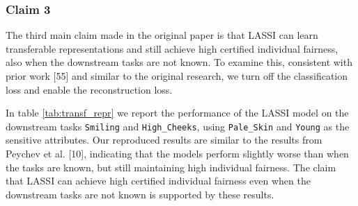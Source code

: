 
\subsubsection{Claim 3} The third main claim made in the original paper is that LASSI can learn transferable representations and still achieve high certified individual fairness, also when the downstream tasks are not known. To examine this, consistent with prior work [55] and similar to the original research, we turn off the classification loss and enable the reconstruction loss. \newline

In table \ref{tab:transf_repr} we report the performance of the LASSI model on the downstream tasks \texttt{Smiling} and \texttt{High\_Cheeks}, using \texttt{Pale\_Skin} and \texttt{Young} as the sensitive attributes. Our reproduced results are similar to the results from Peychev et al. [10], indicating that the models perform slightly worse than when the tasks are known, but still maintaining high individual fairness. The claim that LASSI can achieve high certified individual fairness even when the downstream tasks are not known is supported by these results.



